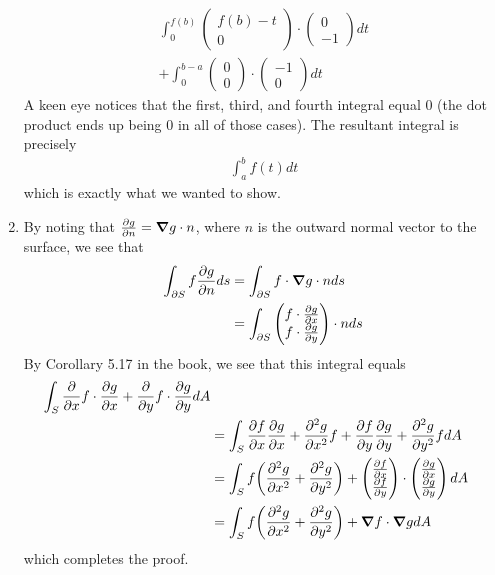 \documentclass[12pt]{article}
\theoremstyle{definition}
\theoremstyle{remark}
\begin{document}
\begin{enumerate}[leftmargin=\labelsep]
\begin{align*}
			\int_0^{f(b)} 
			\begin{pmatrix}
				f(b)-t \\ 0
			\end{pmatrix} \cdot 
			\begin{pmatrix}
				0 \\ -1
			\end{pmatrix}dt \\
			+ \int_0^{b-a} \begin{pmatrix}
				0 \\ 0
			\end{pmatrix} \cdot 
			\begin{pmatrix}
			-1 \\ 0
			\end{pmatrix}dt
		\end{align*}
		A keen eye notices that the first, third, and fourth integral equal 0 (the dot product ends up being 0 in all of those cases). The resultant integral is precisely 
		\begin{align*}
			\int_a^b f(t)dt
		\end{align*}
		which is exactly what we wanted to show.
		
		\item By noting that $\pdv{g}{n} = \grad g \cdot n$, where $n$ is the outward normal vector to the surface, we see that 
		\begin{align*}
			\int_{\partial S} f \pdv{g}{n}ds &= \int_{\partial S} f \cdot \grad g \cdot n ds \\
			&= \int_{\partial S} 
			\begin{pmatrix}
				f \cdot \pdv{g}{x} \\
				f \cdot \pdv{g}{y}
			\end{pmatrix} \cdot n ds
		\end{align*}
		By Corollary 5.17 in the book, we see that this integral equals
		\begin{align*}
			\int_{S} \pdv{x} f \cdot \pdv{g}{x} + \pdv{y} f \cdot \pdv{g}{y} dA \\ &= \int_S \pdv{f}{x} \pdv{g}{x} + \pdv[2]{g}{x} f + \pdv{f}{y}\pdv{g}{y} + \pdv[2]{g}{y} fdA
			\\ &= \int_S f\qty(\pdv[2]{g}{x} + \pdv[2]{g}{y}) + \begin{pmatrix}
				\pdv{f}{x} \\
				\pdv{f}{y}
			\end{pmatrix} \cdot \begin{pmatrix}
			\pdv{g}{x} \\
			\pdv{g}{y}
		\end{pmatrix}dA \\
	&= \int_S f\qty(\pdv[2]{g}{x}+\pdv[2]{g}{y}) + \grad{f} \cdot \grad{g}dA
		\end{align*}	
		which completes the proof.
		

\end{enumerate}
\end{document}
